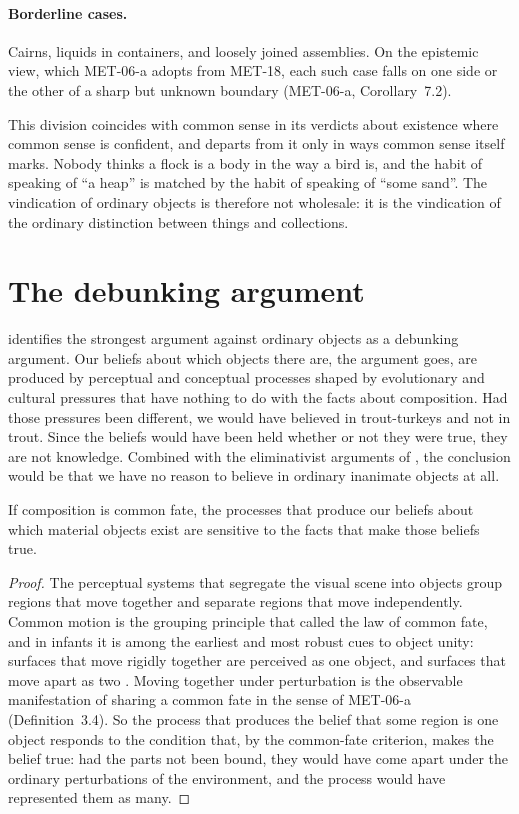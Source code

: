 \documentclass{situationist-preprint}
\begin{document}
\paragraph{Borderline cases.} Cairns, liquids in containers, and loosely joined assemblies. On the epistemic view, which MET-06-a adopts from MET-18, each such case falls on one side or the other of a sharp but unknown boundary (MET-06-a, Corollary~7.2).

This division coincides with common sense in its verdicts about existence where common sense is confident, and departs from it only in ways common sense itself marks. Nobody thinks a flock is a body in the way a bird is, and the habit of speaking of \enquote{a heap} is matched by the habit of speaking of \enquote{some sand}. The vindication of ordinary objects is therefore not wholesale: it is the vindication of the ordinary distinction between things and collections.

\section{The debunking argument}

\citet{Korman2015} identifies the strongest argument against ordinary objects as a debunking argument. Our beliefs about which objects there are, the argument goes, are produced by perceptual and conceptual processes shaped by evolutionary and cultural pressures that have nothing to do with the facts about composition. Had those pressures been different, we would have believed in trout-turkeys and not in trout. Since the beliefs would have been held whether or not they were true, they are not knowledge. Combined with the eliminativist arguments of \citet{Merricks2001}, the conclusion would be that we have no reason to believe in ordinary inanimate objects at all.

\begin{proposition}\label{p:tracking}
If composition is common fate, the processes that produce our beliefs about which material objects exist are sensitive to the facts that make those beliefs true.
\end{proposition}

\begin{proof}
The perceptual systems that segregate the visual scene into objects group regions that move together and separate regions that move independently. Common motion is the grouping principle that \citet{Wertheimer1923} called the law of common fate, and in infants it is among the earliest and most robust cues to object unity: surfaces that move rigidly together are perceived as one object, and surfaces that move apart as two \citep{Spelke1990}. Moving together under perturbation is the observable manifestation of sharing a common fate in the sense of MET-06-a (Definition~3.4). So the process that produces the belief that some region is one object responds to the condition that, by the common-fate criterion, makes the belief true: had the parts not been bound, they would have come apart under the ordinary perturbations of the environment, and the process would have represented them as many.
\end{proof}
\end{document}

